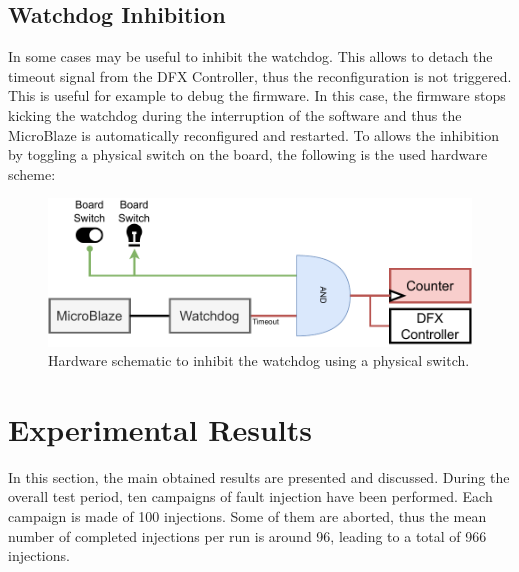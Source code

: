 \subsection{Watchdog Inhibition}
In some cases may be useful to inhibit the watchdog. This allows to detach the timeout signal from the DFX Controller, thus the reconfiguration is not triggered. This is useful for example to debug the firmware. In this case, the firmware stops kicking the watchdog during the interruption of the software and thus the MicroBlaze is automatically reconfigured and restarted. To allows the inhibition by toggling a physical switch on the board, the following is the used hardware scheme:

\begin{figure}[H]
\centering
\includegraphics[width=0.95\linewidth]{images/chapter5/btn.pdf}
\caption{Hardware schematic to inhibit the watchdog using a physical switch.}
\end{figure}



\section{Experimental Results}

In this section, the main obtained results are presented and discussed. During the overall test period, ten campaigns of fault injection have been performed. Each campaign is made of 100 injections. Some of them are aborted, thus the mean number of completed injections per run is around 96, leading to a total of 966 injections. \bigskip


